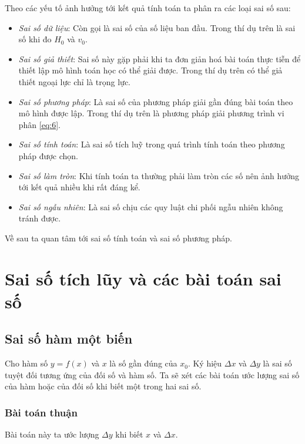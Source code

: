 \documentclass{book}    %
\begin{document}
Theo các yếu tố ảnh hưởng tới kết quả tính toán ta phân ra các loại sai số sau:
\begin{itemize}
    \item \emph{Sai số dữ liệu}: Còn gọi là sai số của số liệu ban đầu. Trong
        thí dụ trên là sai số khi đo \(H_0\) và \(v_0\).
    \item \emph{Sai số giả thiết}: Sai số này gặp phải khi ta đơn giản hoá bài
        toán thực tiễn để thiết lập mô hình toán học có thể giải được. Trong thí
        dụ trên có thể giả thiết ngoại lực chỉ là trọng lực.
    \item \emph{Sai số phương pháp}: Là sai số của phương pháp giải gần đúng bài
        toán theo mô hình được lập. Trong thí dụ trên là phương pháp giải phương
        trình vi phân \ref{eq:6}.
    \item \emph{Sai số tính toán}: Là sai số tích luỹ trong quá trình tính toán
        theo phương pháp được chọn.
    \item \emph{Sai số làm tròn}: Khi tính toán ta thường phải làm tròn các số
        nên ảnh hưởng tới kết quả nhiều khi rất đáng kể.
    \item \emph{Sai số ngẫu nhiên}: Là sai số chịu các quy luật chi phối ngẫu
        nhiên không tránh được.
\end{itemize}

Về sau ta  quan tâm tới sai số tính toán và sai số phương pháp.

\section{Sai số tích lũy và các bài toán sai số}

\subsection{Sai số hàm một biến}

Cho hàm số \(y = f(x)\) và \(x\) là số gần đúng của \(x_0\). Ký hiệu \(\Delta
x\) và \(\Delta y\) là sai số tuyệt đối tương ứng của đối số và hàm số. Ta sẽ
xét các bài toán ước lượng sai số của hàm hoặc của đối số khi biết một trong hai
sai số.

\subsubsection{Bài toán thuận}

Bài toán này ta ước lượng \(\Delta y\) khi biết \(x\) và \(\Delta x\).
\end{document}

